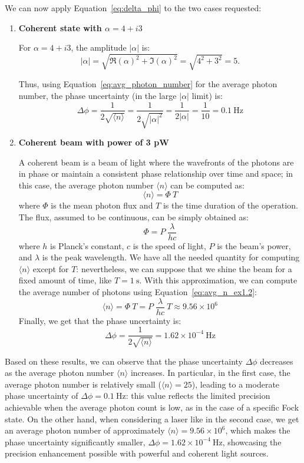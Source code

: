 \documentclass[prl, 11 pt]{revtex4-2}
\begin{document}
We can now apply Equation~\eqref{eq:delta_phi} to the two cases requested:
\begin{enumerate}
    \item \textbf{Coherent state with $\alpha = 4 + i3$}
    
    For $\alpha = 4 + i3$, the amplitude $|\alpha|$ is:
    $$
        |\alpha| = \sqrt{\Re(\alpha)^2 + \Im(\alpha)^2} = \sqrt{4^2 + 3^2} = 5.
    $$
        
    Thus, using Equation~\eqref{eq:avg_photon_number} for the average photon number, the phase uncertainty (in the large $|\alpha|$ limit) is:
    $$
        \Delta \phi = \frac{1}{2\sqrt{\langle n \rangle}} = \frac{1}{2\sqrt{|\alpha|^2}} = \frac{1}{2|\alpha|} = \frac{1}{10} = 0.1~\si{\hertz}
    $$

    \item \textbf{Coherent beam with power of 3 pW}

    A coherent beam is a beam of light where the wavefronts of the photons are in phase or maintain a consistent phase relationship over time and space; in this case, the average photon number $\langle n \rangle$ can be computed as:
    \begin{equation}
        \label{eq:avg_n_ex1.2}
        \langle n \rangle = \Phi \:T
    \end{equation}
    where $\Phi$ is the mean photon flux and $T$ is the time duration of the operation. The flux, assumed to be continuous, can be simply obtained as:
    \begin{equation}
        \label{eq:flux}
        \Phi = P\; \frac{\lambda}{hc}
    \end{equation}
    where $h$ is Planck’s constant, $c$ is the speed of light, $P$ is the beam's power, and $\lambda$ is the peak wavelength. We have all the needed quantity for computing $\langle n \rangle$ except for $T$: nevertheless, we can suppose that we shine the beam for a fixed amount of time, like $T = 1~\si{\second}$. With this approximation, we can compute the average number of photons using Equation~\eqref{eq:avg_n_ex1.2}:
    $$
        \langle n \rangle = \Phi \:T = P\; \frac{\lambda}{hc} \:T \approx 9.56 \times 10^6
    $$
    Finally, we get that the phase uncertainty is:
    $$
        \Delta \phi = \frac{1}{2\sqrt{\langle n \rangle}} = 1.62 \times 10^{-4}~\si{\hertz}
    $$
\end{enumerate}

Based on these results, we can observe that the phase uncertainty $\Delta \phi$ decreases as the average photon number $\langle n \rangle$ increases. In particular, in the first case, the average photon number is relatively small ($\langle n \rangle = 25$), leading to a moderate phase uncertainty of $\Delta \phi = 0.1~\si{\hertz}$: this value reflects the limited precision achievable when the average photon count is low, as in the case of a specific Fock state. On the other hand, when considering a laser like in the second case, we get an average photon number of approximately $\langle n \rangle = 9.56 \times 10^6$, which makes the phase uncertainty significantly smaller, $\Delta \phi = 1.62 \times 10^{-4}~\si{\hertz}$, showcasing the precision enhancement possible with powerful and coherent light sources.
\end{document}
